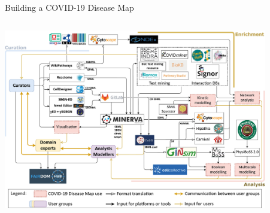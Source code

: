 \documentclass[compress,ignorenonframetext,aspectratio=1610]{beamer}
\begin{document}
\begin{frame}{Building a COVID-19 Disease Map}
	\begin{columns}
		\begin{column}{0.6\textwidth}
			\centering
			\includegraphics[width=0.9\textwidth]{figs/methods/covid19-diseasemap-consrtium.jpg}

		\end{column}

		\pause

		\begin{column}{0.4\textwidth}

		\end{column}

	\end{columns}

\end{frame}
\end{document}
